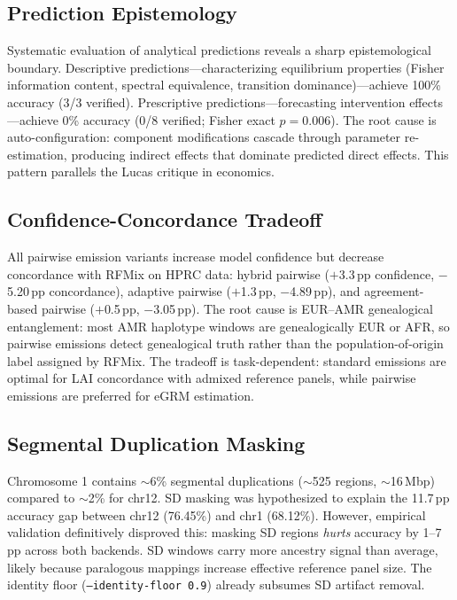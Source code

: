 \documentclass[11pt]{article}
\begin{document}
\subsection{Prediction Epistemology}
\label{sec:supp_prediction}

Systematic evaluation of analytical predictions reveals a sharp epistemological boundary. Descriptive predictions---characterizing equilibrium properties (Fisher information content, spectral equivalence, transition dominance)---achieve 100\% accuracy (3/3 verified). Prescriptive predictions---forecasting intervention effects---achieve 0\% accuracy (0/8 verified; Fisher exact $p = 0.006$). The root cause is auto-configuration: component modifications cascade through parameter re-estimation, producing indirect effects that dominate predicted direct effects. This pattern parallels the Lucas critique in economics.

\subsection{Confidence-Concordance Tradeoff}
\label{sec:supp_confidence}

All pairwise emission variants increase model confidence but decrease concordance with RFMix on HPRC data: hybrid pairwise ($+$3.3\,pp confidence, $-$5.20\,pp concordance), adaptive pairwise ($+$1.3\,pp, $-$4.89\,pp), and agreement-based pairwise ($+$0.5\,pp, $-$3.05\,pp). The root cause is EUR--AMR genealogical entanglement: most AMR haplotype windows are genealogically EUR or AFR, so pairwise emissions detect genealogical truth rather than the population-of-origin label assigned by RFMix. The tradeoff is task-dependent: standard emissions are optimal for LAI concordance with admixed reference panels, while pairwise emissions are preferred for eGRM estimation.

\subsection{Segmental Duplication Masking}
\label{sec:supp_sd_masking}

Chromosome 1 contains $\sim$6\% segmental duplications ($\sim$525 regions, $\sim$16\,Mbp) compared to $\sim$2\% for chr12. SD masking was hypothesized to explain the 11.7\,pp accuracy gap between chr12 (76.45\%) and chr1 (68.12\%). However, empirical validation definitively disproved this: masking SD regions \emph{hurts} accuracy by 1--7\,pp across both backends. SD windows carry more ancestry signal than average, likely because paralogous mappings increase effective reference panel size. The identity floor (\texttt{--identity-floor 0.9}) already subsumes SD artifact removal.
\end{document}

